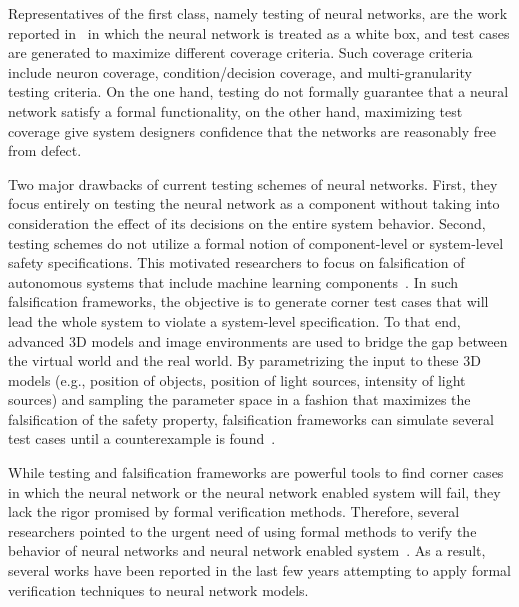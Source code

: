 Representatives of the first class, namely testing of neural networks, are the work reported in~\cite{pei2017deepxplore,tian2017deeptest,wicker2018feature,YouchengTesting2018,LeiDeepGauge2018,Wang2018Testing,LeiDeepMutation2018,srisakaokul2018multiple,MengshiDeepRoad2018,YouchengConcolic2018} in which the neural network is treated as a white box, and test cases are generated to maximize different coverage criteria. Such coverage criteria include neuron coverage, condition/decision coverage, and multi-granularity testing criteria. On the one hand, testing do not formally guarantee that a neural network satisfy a formal functionality, on the other hand, maximizing test coverage give system designers confidence that the networks are reasonably free from defect. %


Two major drawbacks of current testing schemes of neural networks. First, they focus entirely on testing the neural network as a component without taking into consideration the effect of its decisions on the entire system behavior. Second, testing schemes do not utilize a formal notion of component-level or system-level safety specifications. This motivated researchers to focus on falsification of autonomous systems that include machine learning components~\cite{dreossi2017compositional,tuncali2018simulation,zhang2018two}. In such falsification frameworks, the objective is to generate corner test cases that will lead the whole system to violate a system-level specification. To that end, advanced 3D models and image environments are used to bridge the gap between the virtual world and the real world. By parametrizing the input to these 3D models (e.g., position of objects, position of light sources, intensity of light sources) and sampling the parameter space in a fashion that maximizes the falsification of the safety property, falsification frameworks can simulate several test cases until a counterexample is found~\cite{dreossi2017compositional,tuncali2018simulation,zhang2018two}.


While testing and falsification frameworks are powerful tools to find corner cases in which the neural network or the neural network enabled system will fail, they lack the rigor promised by formal verification methods. Therefore, several researchers pointed to the urgent need of using formal methods to verify the behavior of neural networks and neural network enabled system~\cite{kurd2003establishing,seshia2016towards,seshia2018formal,leikeAIsafety2017,leofante2018automated,scheibler2015towards}. As a result, several works have been reported in the last few years attempting to apply formal verification techniques to neural network models. 

